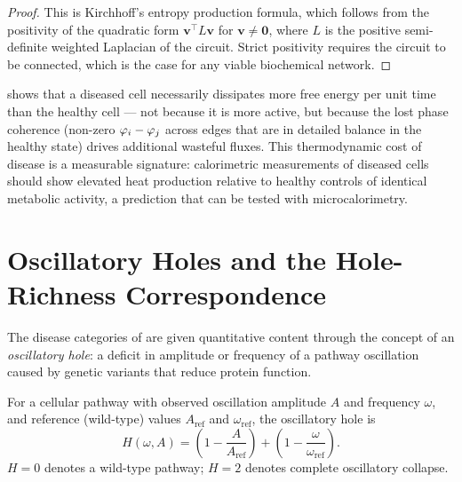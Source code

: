 \begin{proof}
This is Kirchhoff's entropy production formula, which follows from the
positivity of the quadratic form $\mathbf{v}^\top L \mathbf{v}$ for $\mathbf{v} \neq \mathbf{0}$,
where $L$ is the positive semi-definite weighted Laplacian of the circuit.
Strict positivity requires the circuit to be connected, which is the case
for any viable biochemical network.
\end{proof}

\begin{remark}
 shows that a diseased cell necessarily
dissipates more free energy per unit time than the healthy cell — not
because it is more active, but because the lost phase coherence
(non-zero $\varphi_i - \varphi_j$ across edges that are in
detailed balance in the healthy state) drives additional wasteful fluxes.
This thermodynamic cost of disease is a measurable signature: calorimetric
measurements of diseased cells should show elevated heat production relative
to healthy controls of identical metabolic activity, a prediction that can
be tested with microcalorimetry.
\end{remark}

\section{Oscillatory Holes and the Hole-Richness Correspondence}
\label{sec:ch07-oscillatory-holes}

The disease categories of  are given quantitative
content through the concept of an \emph{oscillatory hole}: a deficit in
amplitude or frequency of a pathway oscillation caused by genetic variants
that reduce protein function.

\begin{definition}
\label{def:ch07-oscillatory-hole}
For a cellular pathway with observed oscillation amplitude $A$ and frequency
$\omega$, and reference (wild-type) values $A_{\mathrm{ref}}$ and
$\omega_{\mathrm{ref}}$, the oscillatory hole is
\begin{equation}
  H(\omega, A)
  = \left(1 - \frac{A}{A_{\mathrm{ref}}}\right)
    + \left(1 - \frac{\omega}{\omega_{\mathrm{ref}}}\right).
  \label{eq:ch07-oscillatory-hole}
\end{equation}
$H = 0$ denotes a wild-type pathway; $H = 2$ denotes complete oscillatory
collapse.
\end{definition}

